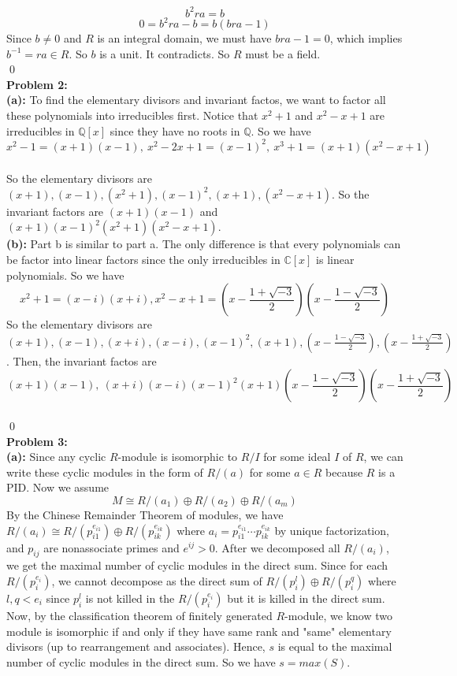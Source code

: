 \documentclass[12pt]{amsart}
\newcommand{\Q}{\mathbb{Q}}
\newcommand{\C}{\mathbb{C}}
\begin{document}
\[b^2ra=b\]
\[0=b^2ra-b=b(bra-1)\]
Since $b\neq 0$ and $R$ is an integral domain, we must have $bra-1=0$, which implies $b^{-1}=ra\in R$. So $b$ is a unit. It contradicts. So $R$ must be a field.
\\\qed\\
\textbf{Problem 2:}\\
\textbf{(a):} To find the elementary divisors and invariant factos, we want to factor all these polynomials into irreducibles first. Notice that $x^2+1$ and $x^2-x+1$ are irreducibles in $\Q[x]$ since they have no roots in $\Q$. So we have 
\[x^2-1=(x+1)(x-1), \ x^2-2x+1=(x-1)^2, \ x^3+1=(x+1)(x^2-x+1) \]\\
So the elementary divisors are $(x+1),(x-1), (x^2+1),(x-1)^2,(x+1),(x^2-x+1)$. So the invariant factors are $(x+1)(x-1)$ and $(x+1)(x-1)^2(x^2+1)(x^2-x+1)$.
\\\textbf{(b):} Part b is similar to part a. The only difference is that every polynomials can be factor into linear factors since the only irreducibles in $\C[x]$ is linear polynomials. So we have 
\[x^2+1=(x-i)(x+i), x^2-x+1=(x-\frac{1+\sqrt{-3}}{2})(x-\frac{1-\sqrt{-3}}{2})\]
So the elementary divisors are $(x+1),(x-1), (x+i),(x-i),(x-1)^2,(x+1),(x-\frac{1-\sqrt{-3}}{2}),(x-\frac{1+\sqrt{-3}}{2})$. Then, the invariant factos are 
\[(x+1)(x-1),\  (x+i)(x-i)(x-1)^2(x+1)(x-\frac{1-\sqrt{-3}}{2})(x-\frac{1+\sqrt{-3}}{2})\]
\\\qed\\
\textbf{Problem 3:}\\
\textbf{(a):} Since any cyclic $R$-module is isomorphic to $R/I$ for some ideal $I$ of $R$, we can write these cyclic modules in the form of $R/(a)$ for some $a\in R$ because $R$ is a PID. Now we assume 
\[M\cong R/(a_1)\oplus R/(a_2)\oplus R/(a_m)\]
By the Chinese Remainder Theorem of modules, we have $R/(a_i)\cong R/(p_{i1}^{e_{i1}})\oplus R/(p_{ik}^{e_{ik}})$ where $a_i=p_{i1}^{e_{i1}}\cdots p_{ik}^{e_{ik}}$ by unique factorization, and $p_{ij}$ are nonassociate primes and $e^{ij}>0$. After we decomposed all $R/(a_i)$, we get the maximal number of cyclic modules in the direct sum. Since for each $R/(p_i^{e_i})$, we cannot decompose as the direct sum of $R/(p_i^l)\oplus R/(p_i^q)$ where $l,q<e_i$ since $p_i^l$ is not killed in the $R/(p_i^{e_i})$ but it is killed in the direct sum. Now, by the classification theorem of finitely generated $R$-module, we know two module is isomorphic if and only if they have same rank and "same" elementary divisors (up to rearrangement and associates). Hence, $s$ is equal to the maximal number of cyclic modules in the direct sum. So we have $s=max(S)$.\\
\end{document}
